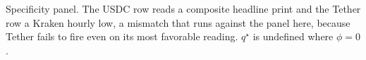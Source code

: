 \documentclass[runningheads]{llncs}
\newlength{\tblw}
\newcommand{\checkwidth}[1]{\settowidth{\tblw}{#1}\ifdim\tblw>\textwidth\GenericError{}{TABLE TOO WIDE}{}{}\fi}
\begin{document}
\begin{table}[t]
\centering
\caption{Specificity panel. The USDC row reads a composite headline print and the Tether
row a Kraken hourly low, a mismatch that runs against the panel here, because Tether
fails to fire even on its most favorable reading. $q^{\star}$ is undefined where
$\phi=0$.}
\label{tab:panel}
\small
\setlength{\tabcolsep}{2pt}
\checkwidth{\small\setlength{\tabcolsep}{2pt}}

\end{table}







\end{document}
